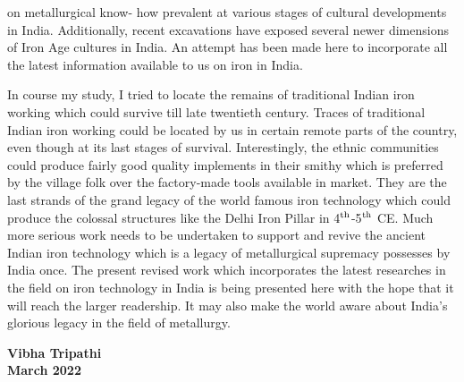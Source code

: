 on metallurgical know- how prevalent at various stages of cultural developments in India. Additionally, recent excavations have exposed several newer dimensions of Iron Age cultures in India. An attempt has been made here to incorporate all the latest information available to us on iron in India.

In course my study, I tried to locate the remains of traditional Indian iron working which could survive till late twentieth century. Traces of traditional Indian iron working could be located by us in certain remote parts of the country, even though at its last stages of survival. Interestingly, the ethnic communities could produce fairly good quality implements in their smithy which is preferred by the village folk over the factory-made tools available in market. They are the last strands of the grand legacy of the world famous iron technology which could produce the colossal structures like the Delhi Iron Pillar in 4$^{\rm th}$-5$^{\rm th}$ CE. Much more serious work needs to be undertaken to support and revive the ancient Indian iron technology which is a legacy of metallurgical supremacy possesses by India once. The present revised work which incorporates the latest researches in the field on iron technology in India is being presented here with the hope that it will reach the larger readership. It may also make the world aware about India’s glorious legacy in the field of metallurgy. 

\noindent
\textbf{Vibha Tripathi\\ March 2022}

\label{endpreface1}
